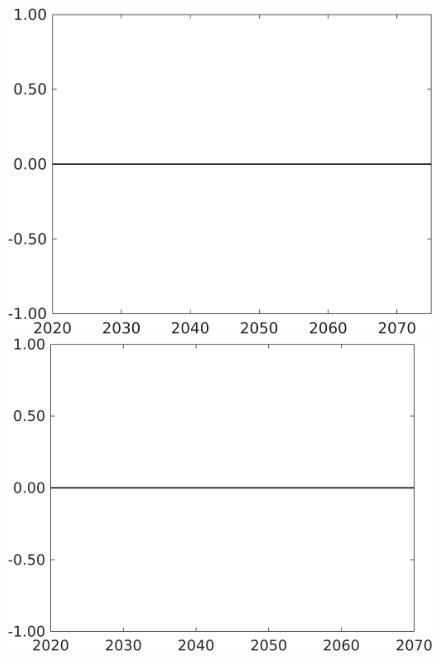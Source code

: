 \documentclass[12pt]{article}
\begin{document}
\begin{figure}[h!!]
\begin{minipage}[]{0.32\textwidth}
	\end{minipage}
	\begin{minipage}[]{0.32\textwidth}
		\includegraphics[width=1\textwidth]{../../codding_model/own_basedOnFried/optimalPol_010922_revision/figures/all_13Sept22/CompTaufPER_bytaul_Reg0_sn_spillover0_nsk0_xgr1_knspil0_sep0_LFlimit1_emsbase0_countec0_GovRev0_etaa0.79_lgd0.png}
	\end{minipage}		
	\begin{minipage}[]{0.32\textwidth}
		\includegraphics[width=1\textwidth]{../../codding_model/own_basedOnFried/optimalPol_010922_revision/figures/all_13Sept22/CompTaufPER_bytaul_Reg0_gAf_spillover0_nsk0_xgr1_knspil0_sep0_LFlimit1_emsbase0_countec0_GovRev0_etaa0.79_lgd0.png}

\end{minipage}
\end{figure}
\end{document}
